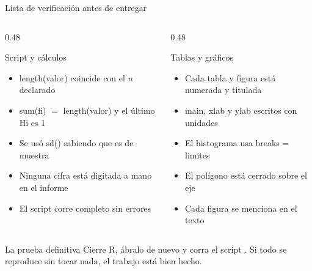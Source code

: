 \documentclass[aspectratio=169,10pt]{beamer}
\newcommand{\fx}[1]{{\ttfamily\color{uniAzul}#1}}
\begin{document}
\begin{frame}{Lista de verificación antes de entregar}
  \scriptsize
  \begin{columns}[T,onlytextwidth]
    \begin{column}{0.48\textwidth}
      \begin{block}{Script y cálculos}
        \tiny{}
        \begin{itemize}\setlength{\itemsep}{-0.05cm}
          \item \fx{length(valor)} coincide con el $n$ declarado
          \item \fx{sum(fi)} $=$ \fx{length(valor)} y el último \fx{Hi} es 1
          \item Se usó \fx{sd()} sabiendo que es de muestra
          \item Ninguna cifra está digitada a mano en el informe
          \item El script corre completo  sin errores
        \end{itemize}
      \end{block}
    \end{column}
    \begin{column}{0.48\textwidth}
      \begin{block}{Tablas y gráficos}
        \tiny{}
        \begin{itemize}\setlength{\itemsep}{-0.05cm}
          \item Cada tabla y figura está numerada y titulada
          \item \fx{main}, \fx{xlab} y \fx{ylab} escritos con unidades
          \item El histograma usa \fx{breaks = limites}
          \item El polígono está cerrado sobre el eje
          \item Cada figura se menciona en el texto
        \end{itemize}
      \end{block}
    \end{column}
  \end{columns}

  \vspace{0.05cm}
  \begin{alertblock}{La prueba definitiva}
    \tiny
    Cierre R, ábralo de nuevo y corra el script . Si todo se reproduce sin tocar nada, el trabajo está bien hecho.
  \end{alertblock}
\end{frame}
\end{document}
